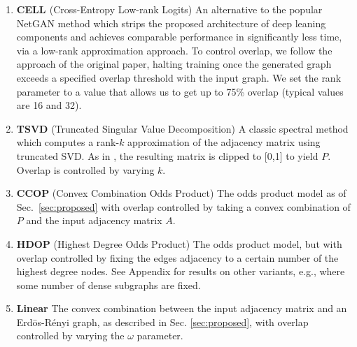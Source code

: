 \begin{enumerate}
\item \textbf{CELL \cite{rendsburgnetgan}} (Cross-Entropy Low-rank Logits) An alternative to the popular NetGAN method \cite{bojchevski2018netgan}
which strips the proposed architecture of deep leaning components and achieves comparable performance
in significantly less time, via a low-rank approximation approach. To control overlap, we follow the approach of the original paper, halting training once the generated graph exceeds a specified overlap threshold with the input graph. We set the rank parameter to a value that allows us to get up to 75\% overlap (typical values are 16 and 32).
\item \textbf{TSVD} (Truncated Singular Value Decomposition) A classic spectral method which computes a rank-$k$ approximation of the adjacency matrix using truncated SVD. As in \cite{SeshadhriSharmaStolman:2020}, the resulting matrix is clipped to [0,1] to yield $P$. Overlap is controlled by varying $k$.
\item \textbf{CCOP} (Convex Combination Odds Product) The odds product model as of Sec.~\ref{sec:proposed} with overlap controlled by taking a convex combination of $P$ and the input  adjacency matrix $A$.
\item \textbf{HDOP} (Highest Degree Odds Product) The odds product model, but with overlap controlled by fixing the edges adjacency to a certain number of the highest degree nodes. See Appendix for results on other variants, e.g., where some number of dense subgraphs are fixed. %
\item \textbf{Linear} The convex combination between the input adjacency matrix and an Erd\"{o}s-R\'enyi graph, as described in Sec. \ref{sec:proposed}, with overlap controlled by varying the $\omega$ parameter. %
\end{enumerate}

